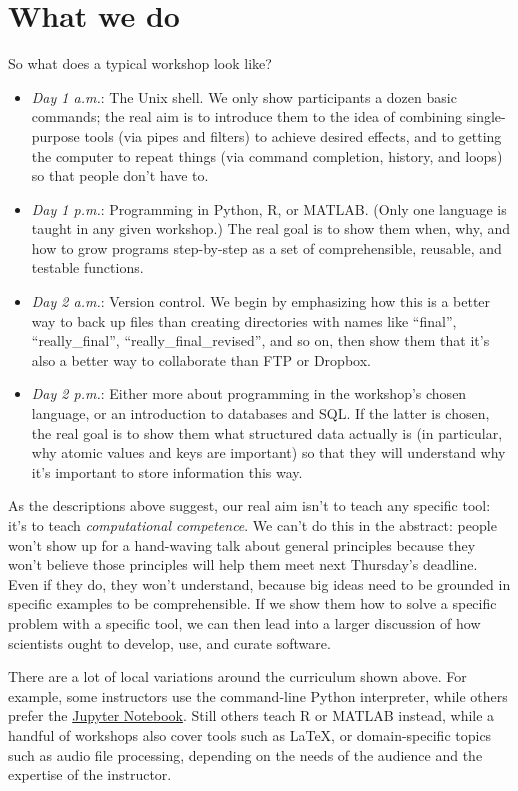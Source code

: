 \documentclass[10pt,a4paper,twocolumn]{article}
\begin{document}
\section{What we do}\label{s:curriculum}

So what does a typical workshop look like?

\begin{itemize}
\item
  \emph{Day 1 a.m.}: The Unix shell. We only show participants a dozen
  basic commands; the real aim is to introduce them to the idea of
  combining single-purpose tools (via pipes and filters) to achieve
  desired effects, and to getting the computer to repeat things (via
  command completion, history, and loops) so that people don't have
  to.
\item
  \emph{Day 1 p.m.}: Programming in Python, R, or MATLAB. (Only one
  language is taught in any given workshop.) The real goal is to show
  them when, why, and how to grow programs step-by-step as a set of
  comprehensible, reusable, and testable functions.
\item
  \emph{Day 2 a.m.}: Version control. We begin by emphasizing how this
  is a better way to back up files than creating directories with names
  like ``final'', ``really\_final'', ``really\_final\_revised'', and
  so on, then show them that it's also a better way to collaborate
  than FTP or Dropbox.
\item
  \emph{Day 2 p.m.}: Either more about programming in the workshop's
  chosen language, or an introduction to databases and SQL.  If the
  latter is chosen, the real goal is to show them what structured data
  actually is (in particular, why atomic values and keys are
  important) so that they will understand why it's important to store
  information this way.
\end{itemize}

As the descriptions above suggest, our real aim isn't to teach any
specific tool: it's to teach \emph{computational competence}. We can't
do this in the abstract: people won't show up for a hand-waving talk
about general principles because they won't believe those principles
will help them meet next Thursday's deadline.  Even if they do, they
won't understand, because big ideas need to be grounded in specific
examples to be comprehensible. If we show them how to solve a specific
problem with a specific tool, we can then lead into a larger
discussion of how scientists ought to develop, use, and curate
software.

There are a lot of local variations around the curriculum shown above.
For example, some instructors use the command-line Python interpreter,
while others prefer the \href{https://jupyter.org/}{Jupyter Notebook}.
Still others teach R or MATLAB instead, while a handful of workshops
also cover tools such as LaTeX, or domain-specific topics such as
audio file processing, depending on the needs of the audience and the
expertise of the instructor.
\end{document}
